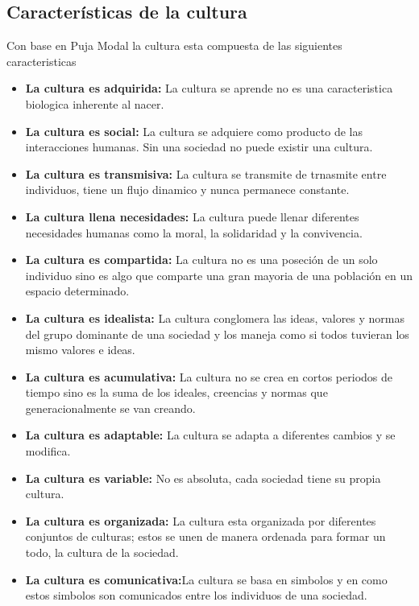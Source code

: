 	\subsection{Características de la cultura}\label{CulturaCaract}
	Con base en Puja Modal la cultura esta compuesta de las siguientes caracteristicas\cite{RefculturaCarac}
	\begin{itemize}
		\item \textbf{La cultura es adquirida:} La cultura se aprende no es una caracteristica biologica inherente al nacer. 
		\item \textbf{La cultura es social:} La cultura se adquiere como producto de las interacciones humanas. Sin una sociedad no puede existir una cultura.
		\item \textbf{La cultura es transmisiva:} La cultura se transmite de trnasmite entre individuos, tiene un flujo dinamico y nunca permanece constante.
		\item \textbf{La cultura llena necesidades:} La cultura puede llenar diferentes necesidades humanas como la moral, la solidaridad y la convivencia.
		\item \textbf{La cultura es compartida:} La cultura no es una poseción de un solo individuo sino es algo que comparte una gran mayoria de una población en un espacio determinado.
		\item \textbf{La cultura es idealista:} La cultura conglomera las ideas, valores y normas del grupo dominante de una sociedad y los maneja como si todos tuvieran los mismo valores e ideas. 
		\item \textbf{La cultura es acumulativa:} La cultura no se crea en cortos periodos de tiempo sino es la suma de los ideales, creencias y normas que generacionalmente se van creando.
		\item \textbf{La cultura es adaptable:} La cultura se adapta a diferentes cambios y se modifica.
		\item \textbf{La cultura es variable:} No es absoluta, cada sociedad tiene su propia cultura.
		\item \textbf{La cultura es organizada:} La cultura esta organizada por diferentes conjuntos de culturas; estos se unen de manera ordenada para formar un todo, la cultura de la sociedad. 
		\item \textbf{La cultura es comunicativa:}La cultura se basa en simbolos y en como estos simbolos son comunicados entre los individuos de una sociedad. 
	\end{itemize}
	
